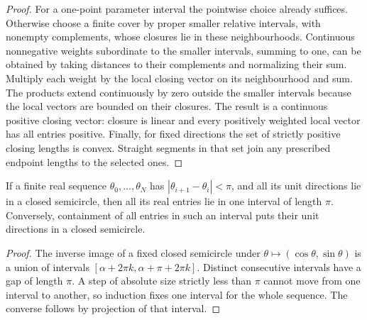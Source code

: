 \begin{proof}
For a one-point parameter interval the pointwise choice already suffices.
Otherwise choose a finite cover by proper smaller relative intervals, with
nonempty complements, whose closures lie in these neighbourhoods.
Continuous nonnegative weights subordinate to the smaller
intervals, summing to one, can be obtained by taking distances to their
complements and normalizing their sum. Multiply each weight by the local
closing vector on its neighbourhood and sum. The products extend continuously
by zero outside the smaller intervals because the local vectors are bounded
on their closures. The result is a continuous positive closing vector: closure
is linear and every positively weighted local vector has all entries positive.
Finally, for fixed directions the set of strictly positive closing lengths is
convex. Straight segments in that set join any prescribed endpoint lengths
to the selected ones.
\end{proof}

\begin{lemma}
\label{lem:transport-angle-interval}
If a finite real sequence $\theta_0,\ldots,\theta_N$ has
$|\theta_{i+1}-\theta_i|<\pi$, and all its unit directions lie in a closed
semicircle, then all its real entries lie in one interval of length $\pi$.
Conversely, containment of all entries in such an interval puts their unit
directions in a closed semicircle.
\end{lemma}
\begin{proof}
The inverse image of a fixed closed semicircle under
$\theta\mapsto(\cos\theta,\sin\theta)$ is a union of intervals
$[\alpha+2\pi k,\alpha+\pi+2\pi k]$. Distinct consecutive intervals have
a gap of length $\pi$. A step of absolute size strictly less than $\pi$
cannot move from one interval to another, so induction fixes one interval
for the whole sequence. The converse follows by projection of that interval.
\end{proof}

